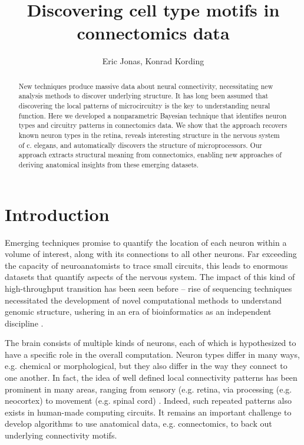 \documentclass{article}
\title{Discovering cell type motifs in connectomics data}
\author{Eric Jonas, Konrad Kording}
\begin{document}
\maketitle



\begin{abstract}
  New techniques produce massive data about neural connectivity,
  necessitating new analysis methods to discover underlying
  structure. It has long been assumed that discovering the local patterns of microcircuitry is the key to understanding neural function. Here we developed a
  nonparametric Bayesian technique that identifies neuron types and circuitry
  patterns in connectomics data. We show that the approach recovers
  known neuron types in the retina, reveals interesting structure in
  the nervous system of c. elegans, and automatically discovers the
  structure of microprocessors. Our approach extracts structural meaning from connectomics, enabling new approaches of deriving anatomical insights from these emerging datasets.


\end{abstract}

\section*{Introduction}
Emerging techniques \autocite{Morgan2013,Zador2012} promise to
quantify the location of each neuron within a volume of interest,
along with its connections to all other neurons. Far exceeding the
capacity of neuroanatomists to trace small circuits, this leads to
enormous datasets that quantify aspects of the nervous system. The impact of
this kind of high-throughput transition has been seen before -- 
rise of sequencing techniques necessitated the
development of novel computational methods to understand genomic
structure, ushering in an era of bioinformatics as an independent
discipline \autocite{}.

The brain consists of multiple kinds of neurons, each of which is
hypothesized to have a specific role in the overall
computation. Neuron types differ in many ways, e.g. chemical or
morphological, but they also differ in the way they connect to one
another. In fact, the idea of well defined local connectivity patterns
has been prominent in many areas, ranging from sensory (e.g. retina,
\autocite{} via processing (e.g. neocortex) to movement (e.g. spinal
cord) \autocite{}. Indeed, such repeated patterns also exists in
human-made computing circuits. It remains an important challenge to
develop algorithms to use anatomical data, e.g. connectomics, to back
out underlying connectivity motifs.
\end{document}
